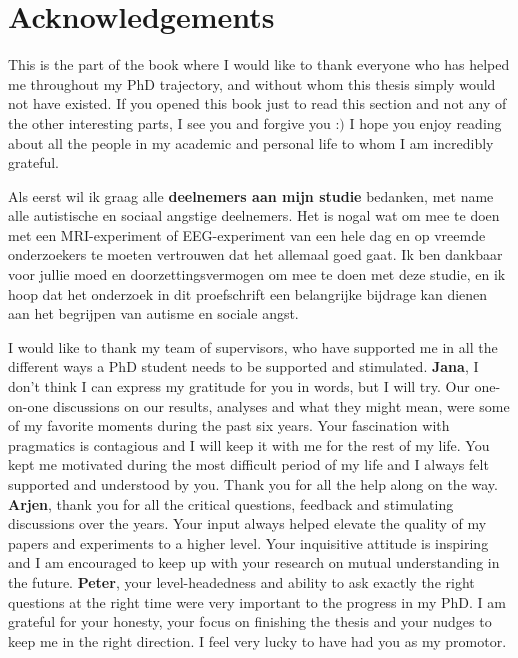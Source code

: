 \chapter*{Acknowledgements}
\label{ch:acknowledgements}

This is the part of the book where I would like to thank everyone who has helped me throughout my PhD trajectory, and without whom this thesis simply would not have existed. If you opened this book just to read this section and not any of the other interesting parts, I see you and forgive you :$)$ I hope you enjoy reading about all the people in my academic and personal life to whom I am incredibly grateful.

Als eerst wil ik graag alle \textbf{deelnemers aan mijn studie} bedanken, met name alle autistische en sociaal angstige deelnemers. Het is nogal wat om mee te doen met een MRI-experiment of EEG-experiment van een hele dag en op vreemde onderzoekers te moeten vertrouwen dat het allemaal goed gaat. Ik ben dankbaar voor jullie moed en doorzettingsvermogen om mee te doen met deze studie, en ik hoop dat het onderzoek in dit proefschrift een belangrijke bijdrage kan dienen aan het begrijpen van autisme en sociale angst. 

I would like to thank my team of supervisors, who have supported me in all the different ways a PhD student needs to be supported and stimulated. \newline 
\textbf{Jana}, I don't think I can express my gratitude for you in words, but I will try. Our one-on-one discussions on our results, analyses and what they might mean, were some of my favorite moments during the past six years. Your fascination with pragmatics is contagious and I will keep it with me for the rest of my life. You kept me motivated during the most difficult period of my life and I always felt supported and understood by you. Thank you for all the help along on the way. \newline
\textbf{Arjen}, thank you for all the critical questions, feedback and stimulating discussions over the years. Your input always helped elevate the quality of my papers and experiments to a higher level. Your inquisitive attitude is inspiring and I am encouraged to keep up with your research on mutual understanding in the future. \newline
\textbf{Peter}, your level-headedness and ability to ask exactly the right questions at the right time were very important to the progress in my PhD. I am grateful for your honesty, your focus on finishing the thesis and your nudges to keep me in the right direction. I feel very lucky to have had you as my promotor. 

